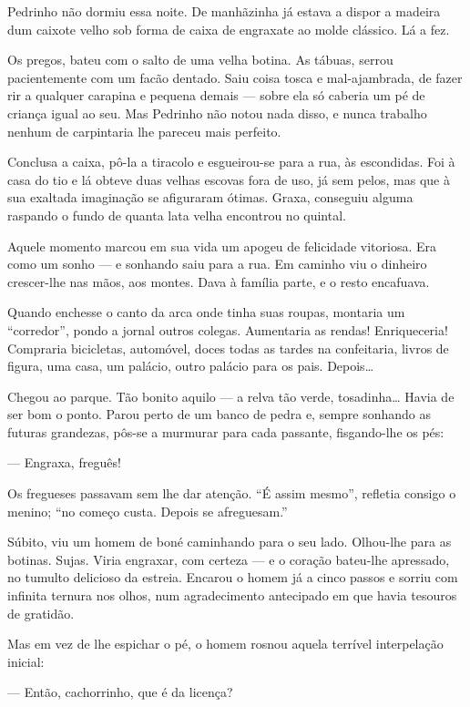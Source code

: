 Pedrinho não dormiu essa noite. De manhãzinha já estava a dispor a
madeira dum caixote velho sob forma de caixa de engraxate ao molde
clássico. Lá a fez.

Os pregos, bateu com o salto de uma velha botina. As tábuas, serrou
pacientemente com um facão dentado. Saiu coisa tosca e mal-ajambrada, de
fazer rir a qualquer carapina e pequena demais --- sobre ela só caberia
um pé de criança igual ao seu. Mas Pedrinho não notou nada disso, e
nunca trabalho nenhum de carpintaria lhe pareceu mais perfeito.

Conclusa a caixa, pô-la a tiracolo e esgueirou-se para a rua, às
escondidas. Foi à casa do tio e lá obteve duas velhas escovas fora de
uso, já sem pelos, mas que à sua exaltada imaginação se afiguraram
ótimas. Graxa, conseguiu alguma raspando o fundo de quanta lata velha
encontrou no quintal.

Aquele momento marcou em sua vida um apogeu de felicidade vitoriosa. Era
como um sonho --- e sonhando saiu para a rua. Em caminho viu o dinheiro
crescer-lhe nas mãos, aos montes. Dava à família parte, e o resto
encafuava.

Quando enchesse o canto da arca onde tinha suas roupas, montaria um
``corredor'', pondo a jornal outros colegas. Aumentaria as rendas!
Enriqueceria! Compraria bicicletas, automóvel, doces todas as tardes na
confeitaria, livros de figura, uma casa, um palácio, outro palácio para
os pais. Depois\ldots{}

Chegou ao parque. Tão bonito aquilo --- a relva tão verde, tosadinha\ldots{}
Havia de ser bom o ponto. Parou perto de um banco de pedra e, sempre
sonhando as futuras grandezas, pôs-se a murmurar para cada passante,
fisgando-lhe os pés:

--- Engraxa, freguês!

Os fregueses passavam sem lhe dar atenção. ``É assim mesmo'', refletia
consigo o menino; ``no começo custa. Depois se afreguesam.''

Súbito, viu um homem de boné caminhando para o seu lado. Olhou-lhe para
as botinas. Sujas. Viria engraxar, com certeza --- e o coração bateu-lhe
apressado, no tumulto delicioso da estreia. Encarou o homem já a cinco
passos e sorriu com infinita ternura nos olhos, num agradecimento
antecipado em que havia tesouros de gratidão.

Mas em vez de lhe espichar o pé, o homem rosnou aquela terrível
interpelação inicial:

--- Então, cachorrinho, que é da licença?

